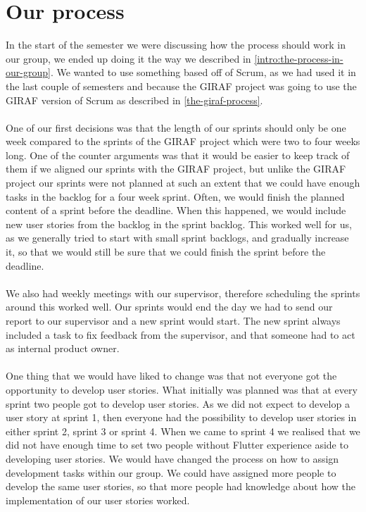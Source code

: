 \section{Our process}
In the start of the semester we were discussing how the process should work in our group, we ended up doing it the way we described in \autoref{intro:the-process-in-our-group}.
We wanted to use something based off of Scrum, as we had used it in the last couple of semesters and because the GIRAF project was going to use the GIRAF version of Scrum as described in \autoref{the-giraf-process}.
\\\\
One of our first decisions was that the length of our sprints should only be one week compared to the sprints of the GIRAF project which were two to four weeks long.
One of the counter arguments was that it would be easier to keep track of them if we aligned our sprints with the GIRAF project, but unlike the GIRAF project our sprints were not planned at such an extent that we could have enough tasks in the backlog for a four week sprint.
Often, we would finish the planned content of a sprint before the deadline.
When this happened, we would include new user stories from the backlog in the sprint backlog. 
This worked well for us, as we generally tried to start with small sprint backlogs, and gradually increase it, so that we would still be sure that we could finish the sprint before the deadline.
\\\\
We also had weekly meetings with our supervisor, therefore scheduling the sprints around this worked well.
Our sprints would end the day we had to send our report to our supervisor and a new sprint would start.
The new sprint always included a task to fix feedback from the supervisor, and that someone had to act as internal product owner.
\\\\
One thing that we would have liked to change was that not everyone got the opportunity to develop user stories.
What initially was planned was that at every sprint two people got to develop user stories.
As we did not expect to develop a user story at sprint 1, then everyone had the possibility to develop user stories in either sprint 2, sprint 3 or sprint 4.
When we came to sprint 4 we realised that we did not have enough time to set two people without Flutter experience aside to developing user stories.
We would have changed the process on how to assign development tasks within our group.
We could have assigned more people to develop the same user stories, so that more people had knowledge about how the implementation of our user stories worked. 
